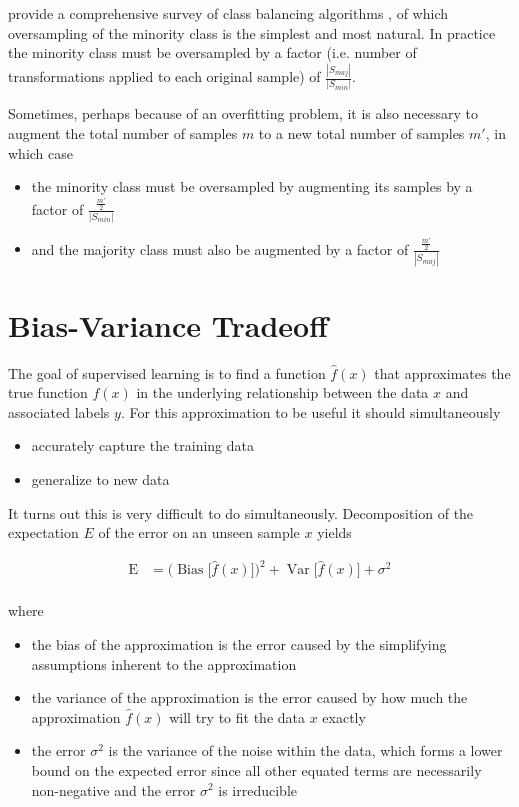 \citeauthor{haibo2009} provide a comprehensive survey of class balancing algorithms \cite{haibo2009}, of which oversampling of the minority class is the simplest and most natural. In practice the minority class must be oversampled by a factor (i.e. number of transformations applied to each original sample) of $\frac{|S_{maj}|}{|S_{min}|}$.

Sometimes, perhaps because of an overfitting problem, it is also necessary to augment the total number of samples $m$ to a new total number of samples $m'$, in which case

\begin{itemize}
    \item the minority class must be oversampled by augmenting its samples  by a factor of $\frac{\frac{m'}{2}}{|S_{min}|}$
    \item and the majority class must also be augmented by a factor of $\frac{\frac{m'}{2}}{|S_{maj}|}$
\end{itemize}

\section{Bias-Variance Tradeoff}

The goal of supervised learning is to find a function $\hat{f}(x)$ that approximates the true function $f(x)$ in the underlying relationship between the data $x$ and associated labels $y$. For this approximation to be useful it should simultaneously

\begin{itemize}
    \item accurately capture the training data
    \item generalize to new data
\end{itemize}

It turns out this is very difficult to do simultaneously. Decomposition of the expectation $E$ of the error on an unseen sample $x$ yields

$$
{\displaystyle {\begin{aligned}\operatorname {E} &={\Big (}\operatorname {Bias} {\big [}{\hat {f}}(x){\big ]}{\Big )}^{2}+\operatorname {Var} {\big [}{\hat {f}}(x){\big ]}+\sigma ^{2}\\\end{aligned}}}
$$

where

\begin{itemize}
    \item the bias of the approximation is the error caused by the simplifying assumptions inherent to the approximation
    \item the variance of the approximation is the error caused by how much the approximation $\hat{f}(x)$ will try to fit the data $x$ exactly
    \item the error $\sigma^2$ is the variance of the noise within the data, which forms a lower bound on the expected error since all other equated terms are necessarily non-negative and the error $\sigma^2$ is irreducible
\end{itemize}

